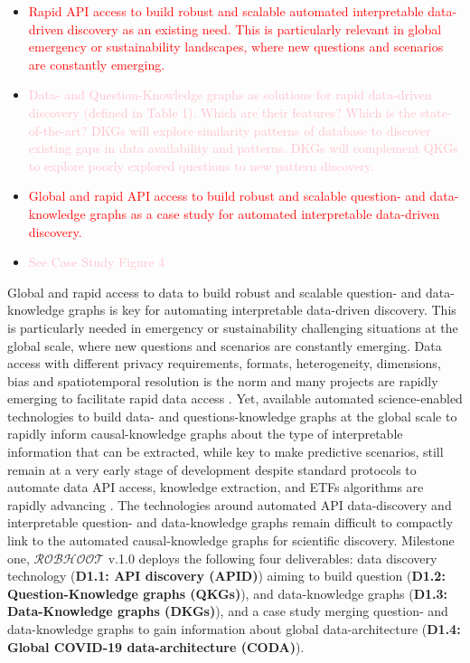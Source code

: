 \documentclass[11pt, a4paper]{article} %
\begin{document}
\begin{itemize}
      \item \textcolor{red}{Rapid API access to build
          robust and scalable automated interpretable data-driven
          discovery as an existing need. This is particularly relevant
          in global emergency or sustainability landscapes, where new
          questions and scenarios are constantly emerging.}
      \item \textcolor{pink}{Data- and Question-Knowledge graphs as
          solutions for rapid data-driven discovery (defined in Table
          1). Which are their features? Which is the state-of-the-art?
          DKGs will explore similarity patterns of database to
          discover existing gaps in data availability and
          patterns. DKGs will complement QKGs to explore poorly
          explored questions to new pattern discovery.  }
      \item \textcolor{red}{Global and rapid API access to build
          robust and scalable question- and data-knowledge graphs as a
          case study for automated interpretable data-driven
          discovery.}
      \item \textcolor{pink}{See Case Study Figure 4}
      \end{itemize}
      
      Global and rapid access to data to build robust and scalable
      question- and data-knowledge graphs is key for automating
      interpretable data-driven discovery. This is particularly needed
      in emergency or sustainability challenging situations at the
      global scale, where new questions and scenarios are constantly
      emerging. Data access with different privacy requirements,
      formats, heterogeneity, dimensions, bias and spatiotemporal
      resolution is the norm and many projects are rapidly emerging to
      facilitate rapid data access
      \citep{Openstreetmap,Bluecloud,HOT,Elixir}. Yet, available
      automated science-enabled technologies to build data- and
      questions-knowledge graphs at the global scale to rapidly inform
      causal-knowledge graphs about the type of interpretable
      information that can be extracted, while key to make predictive
      scenarios, still remain at a very early stage of development
      despite standard protocols to automate data API access,
      knowledge extraction, and ETFs algorithms are rapidly advancing
      \citep{Fan2012,APISGURU,OpenKnowledgeFoundation}. The
      technologies around automated API data-discovery and
      interpretable question- and data-knowledge graphs remain
      difficult to compactly link to the automated causal-knowledge
      graphs for scientific discovery. Milestone one,
      $\mathcal{ROBHOOT}$ v.1.0 deploys the following four
      deliverables: data discovery technology ({\bf D1.1: API
        discovery (APID)}) aiming to build question ({\bf D1.2:
        Question-Knowledge graphs (QKGs)}), and data-knowledge graphs
      ({\bf D1.3: Data-Knowledge graphs (DKGs)}), and a case study
      merging question- and data-knowledge graphs to gain information
      about global data-architecture ({\bf D1.4: Global COVID-19
        data-architecture (CODA)}).
   
\end{document}
